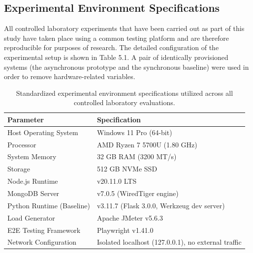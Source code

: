 \subsection{Experimental Environment Specifications}
All controlled laboratory experiments that have been carried out as part of this study have taken place using a common testing platform and are therefore reproducible for purposes of research. The detailed configuration of the experimental setup is shown in Table 5.1. A pair of identically provisioned systems (the asynchronous prototype and the synchronous baseline) were used in order to remove hardware-related variables.
\begin{table}[htbp]
\centering
\begin{tabular}{|l|l|}
\hline
\textbf{Parameter} & \textbf{Specification} \\ \hline
Host Operating System & Windows 11 Pro (64-bit) \\ \hline
Processor & AMD Ryzen 7 5700U (1.80 GHz) \\ \hline
System Memory & 32 GB RAM (3200 MT/s) \\ \hline
Storage & 512 GB NVMe SSD \\ \hline
Node.js Runtime & v20.11.0 LTS \\ \hline
MongoDB Server & v7.0.5 (WiredTiger engine) \\ \hline
Python Runtime (Baseline) & v3.11.7 (Flask 3.0.0, Werkzeug dev server) \\ \hline
Load Generator & Apache JMeter v5.6.3 \\ \hline
E2E Testing Framework & Playwright v1.41.0 \\ \hline
Network Configuration & Isolated localhost (127.0.0.1), no external traffic \\ \hline
\end{tabular}
\caption{Standardized experimental environment specifications utilized across all controlled laboratory evaluations.}
\label{tab:test_env}
\end{table}

